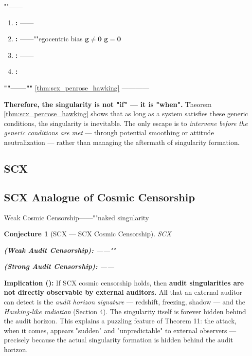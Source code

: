 \documentclass[12pt,a4paper]{article}
\newtheorem{conjecture}[theorem]{Conjecture}
\theoremstyle{remark}
\newcommand{\g}{\mathbf{g}}
\begin{document}
""——

\begin{enumerate}[label=(\arabic*)]
    \item \textbf{:} ——
    
    \item \textbf{:} ——""egocentric bias $\g \neq \mathbf{0}$ $\g = \mathbf{0}$ 
    
    \item \textbf{:} ——
    
    \item \textbf{:} 
\end{enumerate}

\textbf{""——""} \ref{thm:scx_penrose_hawking} \textbf{}————

\vspace{6pt}
\noindent
\textbf{Therefore, the singularity is not "if" — it is "when".} Theorem \ref{thm:scx_penrose_hawking} shows that as long as a system satisfies these generic conditions, the singularity is inevitable. The only escape is to \textit{intervene before the generic conditions are met} — through potential smoothing or attitude neutralization — rather than managing the aftermath of singularity formation.

\subsection{SCX}
\subsection{SCX Analogue of Cosmic Censorship}

\textbf{}Weak Cosmic Censorship——""naked singularity

\begin{conjecture}[SCX — SCX Cosmic Censorship]\label{conj:cosmic_censorship}
SCX\textbf{}

\textbf{ (Weak Audit Censorship):} ——""

\textbf{ (Strong Audit Censorship):} ——
\end{conjecture}

\vspace{4pt}
\noindent
\textbf{Implication ():} If SCX cosmic censorship holds, then \textbf{audit singularities are not directly observable by external auditors.} All that an external auditor can detect is the \textit{audit horizon signature} — redshift, freezing, shadow — and the \textit{Hawking-like radiation} (Section 4). The singularity itself is forever hidden behind the audit horizon. This explains a puzzling feature of Theorem 11: the attack, when it comes, appears "sudden" and "unpredictable" to external observers — precisely because the actual singularity formation is hidden behind the audit horizon.
\end{document}
